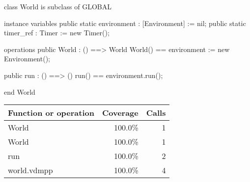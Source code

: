 \documentclass[a4paper]{article}
\begin{document}
\title{}
\author{}
\begin{vdm_al}
class World is subclass of GLOBAL

instance variables
    public static environment : [Environment] := nil;
    public static timer_ref : Timer := new Timer();

operations
    public World : () ==> World
    World() == environment := new Environment();

    public run : () ==> ()
    run() == environment.run();

end World
\end{vdm_al}
\bigskip
\begin{longtable}{|l|r|r|}
\hline
Function or operation & Coverage & Calls \\
\hline
\hline
World & 100.0\% & 1 \\
\hline
World & 100.0\% & 1 \\
\hline
run & 100.0\% & 2 \\
\hline
\hline
world.vdmpp & 100.0\% & 4 \\
\hline
\end{longtable}
\end{document}
